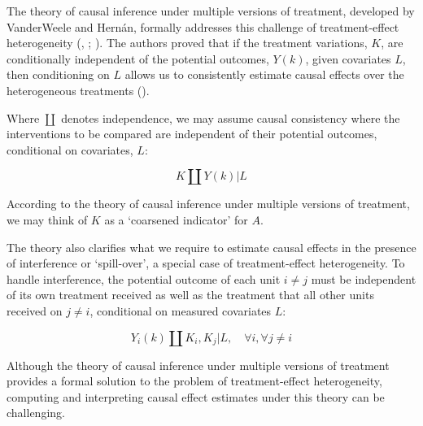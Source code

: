 \documentclass[
  single column]{article}
\begin{document}
The theory of causal inference under multiple versions of treatment,
developed by VanderWeele and Hernán, formally addresses this challenge
of treatment-effect heterogeneity
(,
;
). The
authors proved that if the treatment variations, \(K\), are
conditionally independent of the potential outcomes, \(Y(k)\), given
covariates \(L\), then conditioning on \(L\) allows us to consistently
estimate causal effects over the heterogeneous treatments
().

Where \(\coprod\) denotes independence, we may assume causal consistency
where the interventions to be compared are independent of their
potential outcomes, conditional on covariates, \(L\):

\[
K \coprod Y(k) | L
\]

According to the theory of causal inference under multiple versions of
treatment, we may think of \(K\) as a `coarsened indicator' for \(A\).

The theory also clarifies what we require to estimate causal effects in
the presence of interference or `spill-over', a special case of
treatment-effect heterogeneity. To handle interference, the potential
outcome of each unit \(i \neq j\) must be independent of its own
treatment received as well as the treatment that all other units
received on \(j \neq i\), conditional on measured covariates \(L\):

\[
Y_i(k) \coprod K_i, K_j | L, \quad \forall i, \forall j \neq i
\]

Although the theory of causal inference under multiple versions of
treatment provides a formal solution to the problem of treatment-effect
heterogeneity, computing and interpreting causal effect estimates under
this theory can be challenging.
\end{document}
